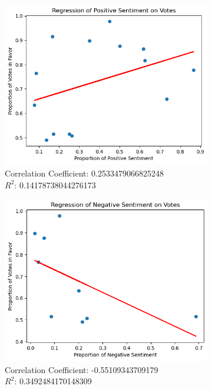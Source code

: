 \documentclass[letterpaper,11pt]{article}
\begin{document}
    \begin{figure}[ht]
      \centering
      \begin{subfigure}{0.45\textwidth}
        \centering
        \includegraphics[width=\linewidth]{figs/fig_13.png}
        \caption{Correlation Coefficient: 0.2533479066825248 \\ $R^2$: 0.14178738044276173}
        \label{fig:sub21}
      \end{subfigure}
      \hfill %
      \begin{subfigure}{0.45\textwidth}
        \centering
        \includegraphics[width=\linewidth]{figs/fig_14.png}
        \caption{Correlation Coefficient: -0.55109343709179 \\ $R^2$: 0.3492484170148309}
        \label{fig:sub22}
      \end{subfigure}
      \caption{}
      \label{fig:main2}
    \end{figure}
\end{document}

